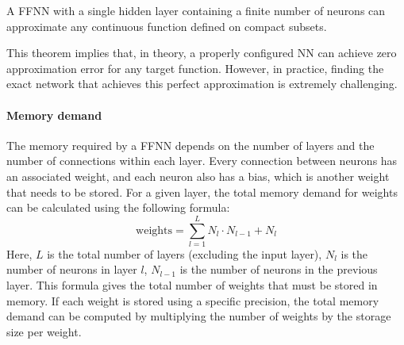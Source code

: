 \begin{theorem}
    A FFNN with a single hidden layer containing a finite number of neurons can approximate any continuous function defined on compact subsets.
\end{theorem}
\noindent This theorem implies that, in theory, a properly configured NN can achieve zero approximation error for any target function. 
However, in practice, finding the exact network that achieves this perfect approximation is extremely challenging.

\paragraph*{Memory demand}
The memory required by a FFNN depends on the number of layers and the number of connections within each layer. 
Every connection between neurons has an associated weight, and each neuron also has a bias, which is another weight that needs to be stored.
For a given layer, the total memory demand for weights can be calculated using the following formula:
\[\text{weights}=\sum_{l=1}^{L}N_l\cdot N_{l-1}+N_l\]
Here, $L$ is the total number of layers (excluding the input layer), $N_l$ is the number of neurons in layer $l$, $N_{l-1}$ is the number of neurons in the previous layer. 
This formula gives the total number of weights that must be stored in memory. 
If each weight is stored using a specific precision, the total memory demand can be computed by multiplying the number of weights by the storage size per weight.
